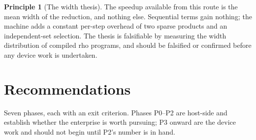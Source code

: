 \documentclass[11pt,a4paper]{article}
\theoremstyle{plain}
\theoremstyle{definition}
\newtheorem{principle}[theorem]{Principle}
\theoremstyle{remark}
\newcommand{\rhoc}{\textsf{rho}}
\begin{document}
\begin{principle}[The width thesis]
\label{prin:width}
The speedup available from this route is the mean width of the reduction, and
nothing else. Sequential terms gain nothing; the machine adds a constant
per-step overhead of two sparse products and an independent-set selection.
The thesis is falsifiable by measuring the width distribution of compiled
\rhoc{} programs, and should be falsified or confirmed before any device work
is undertaken.
\end{principle}

\section{Recommendations}
\label{sec:plan}

Seven phases, each with an exit criterion. Phases P0--P2 are host-side and
establish whether the enterprise is worth pursuing; P3 onward are the device
work and should not begin until P2's number is in hand.
\end{document}
